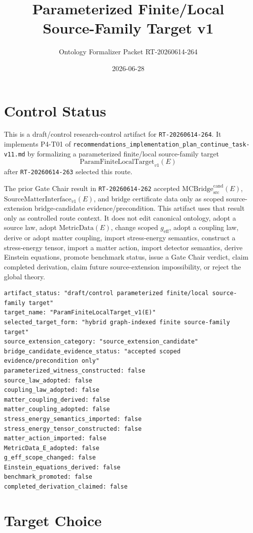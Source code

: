 \documentclass[11pt]{article}
\title{Parameterized Finite/Local Source-Family Target v1}
\author{Ontology Formalizer Packet RT-20260614-264}
\date{2026-06-28}
\newcommand{\MetricData}{\mathrm{MetricData}}
\newcommand{\geff}{g_{\mathrm{eff}}}
\newcommand{\MCBridgeCand}{\mathrm{MCBridge}_{\mathrm{src}}^{\mathrm{cand}}}
\newcommand{\SMI}{\mathrm{SourceMatterInterface}_{v1}}
\newcommand{\PFLFT}{\mathrm{ParamFiniteLocalTarget}_{v1}}
\begin{document}
\maketitle

\section{Control Status}

This is a draft/control research-control artifact for
\texttt{RT-20260614-264}. It implements P4-T01 of
\texttt{recommendations\_implementation\_plan\_continue\_task-v11.md} by
formalizing a parameterized finite/local source-family target
\[
  \PFLFT(E)
\]
after \texttt{RT-20260614-263} selected this route.

The prior Gate Chair result in \texttt{RT-20260614-262} accepted
\(\MCBridgeCand(E)\), \(\SMI(E)\), and bridge certificate data only as scoped
source-extension bridge-candidate evidence/precondition. This artifact uses
that result only as controlled route context. It does not edit canonical
ontology, adopt a source law, adopt \(\MetricData(E)\), change scoped
\(\geff\), adopt a coupling law, derive or adopt matter coupling, import
stress-energy semantics, construct a stress-energy tensor, import a matter
action, import detector semantics, derive Einstein equations, promote
benchmark status, issue a Gate Chair verdict, claim completed derivation,
claim future source-extension impossibility, or reject the global theory.

\begin{verbatim}
artifact_status: "draft/control parameterized finite/local source-family target"
target_name: "ParamFiniteLocalTarget_v1(E)"
selected_target_form: "hybrid graph-indexed finite source-family target"
source_extension_category: "source_extension_candidate"
bridge_candidate_evidence_status: "accepted scoped evidence/precondition only"
parameterized_witness_constructed: false
source_law_adopted: false
coupling_law_adopted: false
matter_coupling_derived: false
matter_coupling_adopted: false
stress_energy_semantics_imported: false
stress_energy_tensor_constructed: false
matter_action_imported: false
MetricData_E_adopted: false
g_eff_scope_changed: false
Einstein_equations_derived: false
benchmark_promoted: false
completed_derivation_claimed: false
\end{verbatim}

\section{Target Choice}
\end{document}
